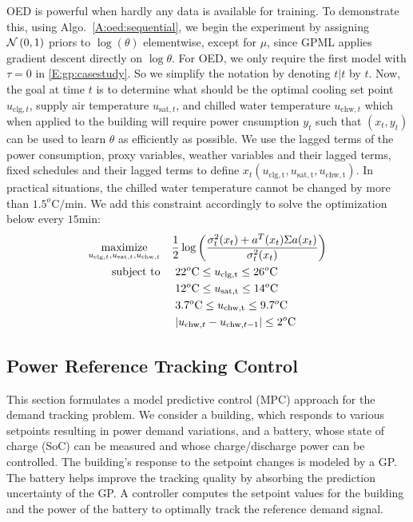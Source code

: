 OED is powerful when hardly any data is available for training. 
To demonstrate this, using Algo.~\ref{A:oed:sequential}, we begin the experiment by assigning \(\operatorname*{\mathcal{N}}\left(0, 1\right)\) priors to \(\log (\theta) \) elementwise, except for \(\mu\), since GPML applies gradient descent directly on \(\log \theta\).
For OED, we only require the first model with \(\tau=0\) in \eqref{E:gp:casestudy}. So we simplify the notation by denoting \(t|t\) by \(t\).
Now, the goal at time \(t\) is to determine what should be the optimal cooling set point \(u_{\mathrm{clg},t}\), supply air temperature \(u_{\mathrm{sat},t}\), and chilled water temperature \(u_{\mathrm{chw},t}\) which when applied to the building will require power cnsumption \(y_t\) such that \((x_t,y_t)\) can be used to learn \(\theta\) as efficiently as possible.
We use the lagged terms of the power consumption, proxy variables, weather variables and their lagged terms, fixed schedules and their lagged terms to define \(x_t(u_{\mathrm{clg,t}},u_{\mathrm{sat,t}},u_{\mathrm{chw,t}})\).
In practical situations, the chilled water temperature cannot be changed by more than \(1.5^o\mathrm{C/min}\). We add this constraint accordingly to solve the optimization below every \(15 \mathrm{min}\):
\begin{align}
\label{E:casestudy:oed}
\maximize_{u_{\mathrm{clg},t},u_{\mathrm{sat},t},u_{\mathrm{chw},t}} & \ \ \ \frac{1}{2}\log\left(\frac{\sigma^2_{t}(x_t)+a^T(x_t)\Sigma a(x_t)}{\sigma^2_{t}(x_t)}\right) \\
\st &  \ \ \ \  22^o\mathrm{C} \leq u_{\mathrm{clg,t}} \leq  26^o\mathrm{C} \nonumber \\
&  \ \ \ \  12^o\mathrm{C} \leq u_{\mathrm{sat,t}} \leq  14^o\mathrm{C} \nonumber \\
&  \ \ \ \  3.7^o\mathrm{C} \leq u_{\mathrm{chw,t}} \leq  9.7^o\mathrm{C} \nonumber \\
&  \ \ \ \  | u_{\mathrm{chw},t} - u_{\mathrm{chw},t-1}| \leq  2^o\mathrm{C} \nonumber
\end{align}


\subsection{Power Reference Tracking Control}
\label{SS:power_tracking}

This section formulates a model predictive control (MPC) approach for the demand tracking problem.
We consider a building, which responds to various setpoints resulting in power demand variations, and a battery, whose state of charge (SoC) can be measured and whose charge/discharge power can be controlled.
The building's response to the setpoint changes is modeled by a GP.
The battery helps improve the tracking quality by absorbing the prediction uncertainty of the GP.
A controller computes the setpoint values for the building and the power of the battery to optimally track the reference demand signal.
\\

